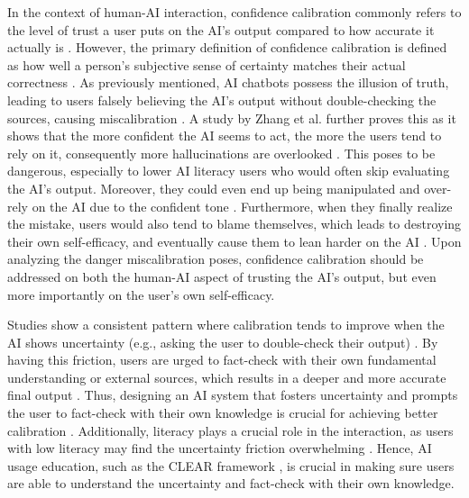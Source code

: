 \documentclass{article}
\begin{document}
In the context of human-AI interaction, confidence calibration commonly refers 
to the level of trust a user puts on the AI's output compared to how 
accurate it actually is \cite{Chong2022}. However, the primary definition of 
confidence calibration is defined as how well a person’s subjective sense of 
certainty matches their actual correctness \cite{Chong2022}.
As previously mentioned, AI chatbots possess the illusion of truth, 
leading to users falsely believing the AI's output without 
double-checking the sources, 
causing miscalibration \cite{Berkowitz2026,sallai2024approach}. 
A study by Zhang et al. further proves this as it shows that 
the more confident the AI seems to act, the more the users tend 
to rely on it, consequently more hallucinations are overlooked \cite{Zhang2020Calibration}. 
This poses to be dangerous, especially to lower AI literacy users who 
would often skip evaluating the AI's output. Moreover, they could even 
end up being manipulated and over-rely on the AI due to the confident tone \cite{KimetAl2026}. 
Furthermore, when they finally realize the mistake, users would also tend to 
blame themselves, which leads to destroying their own self-efficacy, and 
eventually cause them to lean harder on the AI \cite{Chong2022}. 
Upon analyzing the danger miscalibration poses, 
confidence calibration should be addressed on both the human-AI aspect of trusting 
the AI's output, but even more importantly on the user's own self-efficacy.

Studies show a consistent pattern where calibration tends to improve when 
the AI shows uncertainty (e.g., asking the user to double-check their output) \cite{Ma2024Calibration,Berkowitz2026}. 
By having this friction, users are urged to fact-check with their own fundamental understanding or 
external sources, which results in a deeper and more accurate final output \cite{Berkowitz2026}. 
Thus, designing an AI system that fosters uncertainty and prompts the user
to fact-check with their own knowledge is crucial for achieving better calibration \cite{Berkowitz2026}.
Additionally, literacy plays a crucial role in the interaction, as users with low literacy
may find the uncertainty friction overwhelming \cite{Jin2025}. Hence, AI usage education,
such as the CLEAR framework \cite{Lo2023}, is crucial in making sure users are able to
understand the uncertainty and fact-check with their own knowledge.
\end{document}
